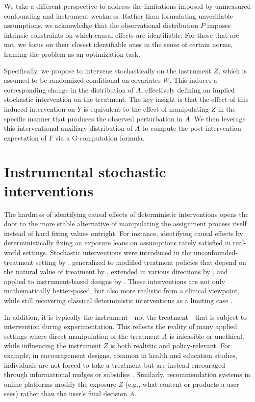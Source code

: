 \documentclass[12pt]{article}
\theoremstyle{thmstyleone}%
\theoremstyle{thmstyletwo}%
\theoremstyle{thmstylethree}%
\begin{document}
We take a different perspective to address the limitations imposed by unmeasured confounding and instrument weakness. Rather than formulating unverifiable assumptions, we acknowledge that the observational distribution $P$ imposes intrinsic constraints on which causal effects are identifiable. For those that are not, we focus on their closest identifiable ones in the sense of certain norms, framing the problem as an optimization task. 

Specifically, we propose to intervene stochastically on the instrument $Z$, which is assumed to be randomized conditional on covariates $W$. This induces a corresponding change in the distribution of $A$, effectively defining an implied stochastic intervention on the treatment. The key insight is that the effect of this induced intervention on $Y$ is equivalent to the effect of manipulating $Z$ in the specific manner that produces the observed perturbation in $A$. We then leverage this interventional auxiliary distribution of $A$ to compute the post-intervention expectation of $Y$ via a G-computation formula. 


\section{Instrumental stochastic interventions}
The hardness of identifying causal effects of deterministic interventions opens the door to the more stable alternative of manipulating the assignment process itself instead of hard fixing values outright. For instance, identifying causal effects by deterministically fixing an exposure leans on assumptions rarely satisfied in real-world settings.  {Stochastic interventions were introduced in the unconfounded-treatment setting by \citet{munoz2012population,diaz2013assessing}, generalized to modified treatment policies that depend on the natural value of treatment by \citet{haneuse2013estimation,young2014identification}, extended in various directions by \citet{kenshift,diaz2023nonparametric,levis2024stochastic}, and applied to instrument-based designs by \citet{mauro,rakshit2024,Qiu02012021}.} These interventions are not only mathematically better-posed, but also more realistic from a clinical viewpoint, while still recovering classical deterministic interventions as a limiting case \citep{rakshit2024,mauro}.


In addition, it is typically the instrument---not the treatment---that is subject to intervention during experimentation. This reflects the reality of many applied settings where direct manipulation of the treatment $A$ is infeasible or unethical, while influencing the instrument $Z$ is both realistic and policy-relevant. For example, in encouragement designs, common in health and education studies, individuals are not forced to take a treatment but are instead encouraged through informational nudges or subsidies \citep{Zelen1979,Zelen1990}. Similarly, recommendation systems in online platforms modify the exposure $Z$ (e.g., what content or products a user sees) rather than the user's final decision $A$. 
\end{document}
